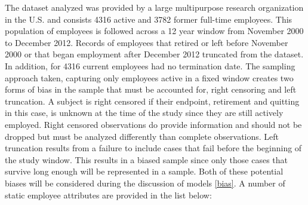 The dataset analyzed was provided by a large multipurpose research organization in the U.S. and consists 4316 active and 3782 former full-time employees.  This population of employees is followed across a 12 year window from November 2000 to December 2012.  Records of employees that retired or left before November 2000 or that began employment after December 2012 truncated from the dataset. In addition, for 4316 current employees had no termination date. The sampling approach taken, capturing only employees active in a fixed window creates two forms of bias in the sample that must be accounted for, right censoring and left truncation. A subject is right censored if their endpoint, retirement and quitting in this case, is unknown at the time of the study since they are still actively employed.  Right censored observations do provide information and should not be dropped but must be analyzed differently than complete observations.   Left truncation results from a failure to include cases that fail before the beginning of the study window.  This results in a biased sample since only those cases that survive long enough will be represented in a sample.  Both of these potential biases will be considered during the discussion of models \ref{bias}.
A number of static employee attributes are provided in the list below:
